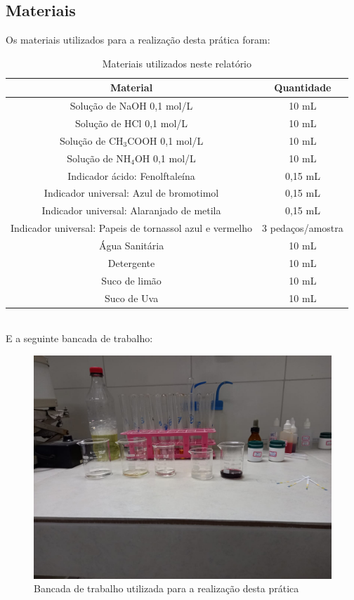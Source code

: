 \documentclass[a4paper, 11pt]{article}
\begin{document}
    \subsection{Materiais}\label{sec:mat_materiais}
    \indent Os materiais utilizados para a realização desta prática foram:
        \begin{table}[h]
        \label{tab:materiais}
        \centering
        \begin{tabular}{|c|c|}
            \hline
            \textbf{Material} & \textbf{Quantidade} \\
            \hline
            Solução de NaOH 0,1 mol/L & 10 mL \\
            \hline
            Solução de HCl 0,1 mol/L & 10 mL \\
            \hline
            Solução de CH$_3$COOH 0,1 mol/L & 10 mL \\
            \hline
            Solução de NH$_4$OH 0,1 mol/L & 10 mL \\
            \hline
            Indicador ácido: Fenolftaleína & 0,15 mL \\
            \hline
            Indicador universal: Azul de bromotimol & 0,15 mL \\
            \hline
            Indicador universal: Alaranjado de metila & 0,15 mL \\
            \hline
            Indicador universal: Papeis de tornassol azul e vermelho & 3 pedaços/amostra \\
            \hline
            Água Sanitária & 10 mL \\
            \hline
            Detergente & 10 mL \\
            \hline
            Suco de limão & 10 mL \\
            \hline
            Suco de Uva & 10 mL \\
            \hline
        \end{tabular}
            \caption{Materiais utilizados neste relatório}
    \end{table}\\
\newpage
    \indent E a seguinte bancada de trabalho:\\
    \begin{figure}[h]
        \centering
        \includegraphics[scale=0.25]{pictures/bancada.jpeg}
        \caption{Bancada de trabalho utilizada para a realização desta prática}\label{fig:figure}
    \end{figure}




\end{document}

